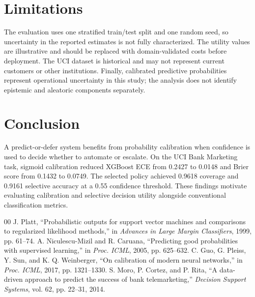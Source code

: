 \documentclass[conference]{IEEEtran}
\begin{document}
\section{Limitations}
The evaluation uses one stratified train/test split and one random seed, so uncertainty in the reported estimates is not fully characterized. The utility values are illustrative and should be replaced with domain-validated costs before deployment. The UCI dataset is historical and may not represent current customers or other institutions. Finally, calibrated predictive probabilities represent operational uncertainty in this study; the analysis does not identify epistemic and aleatoric components separately.

\section{Conclusion}
A predict-or-defer system benefits from probability calibration when confidence is used to decide whether to automate or escalate. On the UCI Bank Marketing task, sigmoid calibration reduced XGBoost ECE from 0.2427 to 0.0148 and Brier score from 0.1432 to 0.0749. The selected policy achieved 0.9618 coverage and 0.9161 selective accuracy at a 0.55 confidence threshold. These findings motivate evaluating calibration and selective decision utility alongside conventional classification metrics.

\begin{thebibliography}{00}
 J. Platt, ``Probabilistic outputs for support vector machines and comparisons to regularized likelihood methods,'' in \emph{Advances in Large Margin Classifiers}, 1999, pp. 61--74.
 A. Niculescu-Mizil and R. Caruana, ``Predicting good probabilities with supervised learning,'' in \emph{Proc. ICML}, 2005, pp. 625--632.
 C. Guo, G. Pleiss, Y. Sun, and K. Q. Weinberger, ``On calibration of modern neural networks,'' in \emph{Proc. ICML}, 2017, pp. 1321--1330.
 S. Moro, P. Cortez, and P. Rita, ``A data-driven approach to predict the success of bank telemarketing,'' \emph{Decision Support Systems}, vol. 62, pp. 22--31, 2014.
\end{thebibliography}
\end{document}
